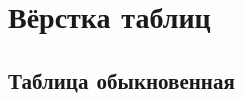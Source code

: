 \chapter{Вёрстка таблиц}\label{ch:ch3}

\section{Таблица обыкновенная}\label{sec:ch3/sect1}

\clearpage
